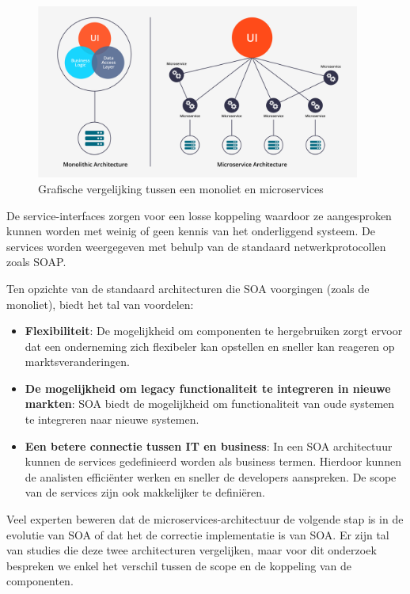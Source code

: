 \begin{figure}[!htb]
    \includegraphics[width=0.95\textwidth]{Microservices_vs_mono.png}
    \caption{Grafische vergelijking tussen een monoliet en microservices \label{microvsmono}}
    \centering

\end{figure}

De service-interfaces zorgen voor een losse koppeling waardoor ze aangesproken kunnen worden met weinig of geen kennis van het onderliggend systeem. De services worden weergegeven met behulp van de standaard netwerkprotocollen zoals SOAP.

Ten opzichte van de standaard architecturen die SOA voorgingen (zoals de monoliet), biedt het tal van voordelen:
\begin{itemize}
     \item \textbf{Flexibiliteit}: De mogelijkheid om componenten te hergebruiken zorgt ervoor dat een onderneming zich flexibeler kan opstellen en sneller kan reageren op marktsveranderingen. 
     \item \textbf{De mogelijkheid om legacy functionaliteit te integreren in nieuwe markten}: SOA biedt de mogelijkheid om functionaliteit van oude systemen te integreren naar nieuwe systemen.
     \item \textbf{Een betere connectie tussen IT en business}: In een SOA architectuur kunnen de services gedefinieerd worden als business termen. Hierdoor kunnen de analisten efficiënter werken en sneller de developers aanspreken. De scope van de services zijn ook makkelijker te definiëren.
\end{itemize} 

Veel experten beweren dat de microservices-architectuur de volgende stap is in de evolutie van SOA of dat het de correctie implementatie is van SOA. Er zijn tal van studies die deze twee architecturen vergelijken, maar voor dit onderzoek bespreken we enkel het verschil tussen de scope en de koppeling van de componenten. \autocite{Education2019}


